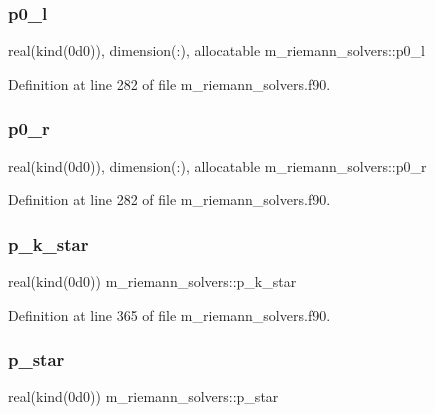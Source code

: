 \subsubsection{\texorpdfstring{p0\+\_\+l}{p0\_l}}
{\footnotesize\ttfamily real(kind(0d0)), dimension(\+:), allocatable m\+\_\+riemann\+\_\+solvers\+::p0\+\_\+l}



Definition at line 282 of file m\+\_\+riemann\+\_\+solvers.\+f90.

\mbox{\label{namespacem__riemann__solvers_aa7deddacb25e873c573761963f680efc}} 
\subsubsection{\texorpdfstring{p0\+\_\+r}{p0\_r}}
{\footnotesize\ttfamily real(kind(0d0)), dimension(\+:), allocatable m\+\_\+riemann\+\_\+solvers\+::p0\+\_\+r}



Definition at line 282 of file m\+\_\+riemann\+\_\+solvers.\+f90.

\mbox{\label{namespacem__riemann__solvers_ac5dad78660af09505fe587f052afdfd5}} 
\subsubsection{\texorpdfstring{p\+\_\+k\+\_\+star}{p\_k\_star}}
{\footnotesize\ttfamily real(kind(0d0)) m\+\_\+riemann\+\_\+solvers\+::p\+\_\+k\+\_\+star}



Definition at line 365 of file m\+\_\+riemann\+\_\+solvers.\+f90.

\mbox{\label{namespacem__riemann__solvers_ab48bf742ff1449dd3e044ce44cc59a56}} 
\subsubsection{\texorpdfstring{p\+\_\+star}{p\_star}}
{\footnotesize\ttfamily real(kind(0d0)) m\+\_\+riemann\+\_\+solvers\+::p\+\_\+star}



